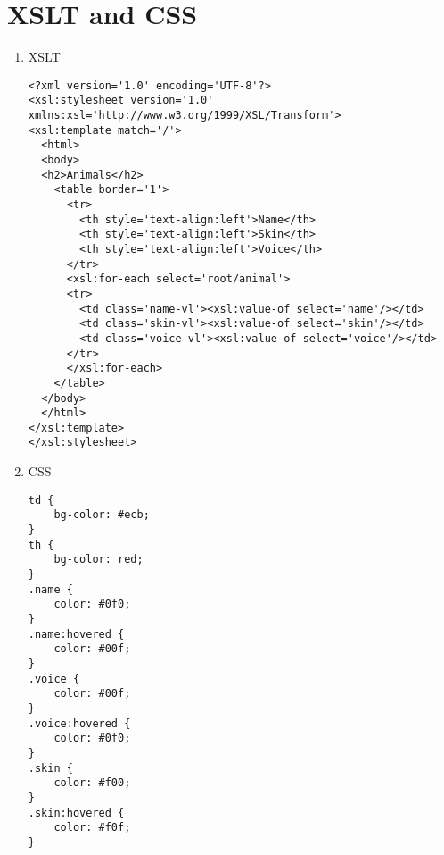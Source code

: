 \documentclass[10pt]{article}
\begin{document}
\section*{XSLT and CSS \\}
\begin{enumerate}
\item XSLT
\begin{verbatim}
<?xml version='1.0' encoding='UTF-8'?>
<xsl:stylesheet version='1.0' xmlns:xsl='http://www.w3.org/1999/XSL/Transform'>
<xsl:template match='/'>
  <html>
  <body>
  <h2>Animals</h2>
    <table border='1'>
      <tr>
        <th style='text-align:left'>Name</th>
        <th style='text-align:left'>Skin</th>
        <th style='text-align:left'>Voice</th>
      </tr>
      <xsl:for-each select='root/animal'>
      <tr>
        <td class='name-vl'><xsl:value-of select='name'/></td>
        <td class='skin-vl'><xsl:value-of select='skin'/></td>
        <td class='voice-vl'><xsl:value-of select='voice'/></td>
      </tr>
      </xsl:for-each>
    </table>
  </body>
  </html>
</xsl:template>
</xsl:stylesheet>
\end{verbatim}

\item CSS
\begin{verbatim}
td {
    bg-color: #ecb;
}
th {
    bg-color: red;  
}
.name {
    color: #0f0;
}
.name:hovered {
    color: #00f;
}
.voice {
    color: #00f;
}
.voice:hovered {
    color: #0f0;
}
.skin {
    color: #f00;
}
.skin:hovered {
    color: #f0f;
}
\end{verbatim}
\end{enumerate} 
\end{document}
